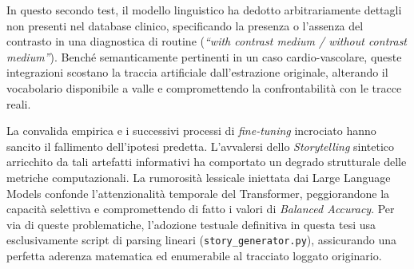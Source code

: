 In questo secondo test, il modello linguistico ha dedotto arbitrariamente dettagli non presenti nel database clinico, specificando la presenza o l'assenza del contrasto in una diagnostica di routine (\textit{``with contrast medium / without contrast medium''}). Benché semanticamente pertinenti in un caso cardio-vascolare, queste integrazioni scostano la traccia artificiale dall'estrazione originale, alterando il vocabolario disponibile a valle e compromettendo la confrontabilità con le tracce reali.

La convalida empirica e i successivi processi di \textit{fine-tuning} incrociato hanno sancito il fallimento dell'ipotesi predetta. L'avvalersi dello \textit{Storytelling} sintetico arricchito da tali artefatti informativi ha comportato un degrado strutturale delle metriche computazionali. La rumorosità lessicale iniettata dai Large Language Models confonde l'attenzionalità temporale del Transformer, peggiorandone la capacità selettiva e compromettendo di fatto i valori di \textit{Balanced Accuracy}. Per via di queste problematiche, l'adozione testuale definitiva in questa tesi usa esclusivamente script di parsing lineari (\texttt{story\_generator.py}), assicurando una perfetta aderenza matematica ed enumerabile al tracciato loggato originario.
